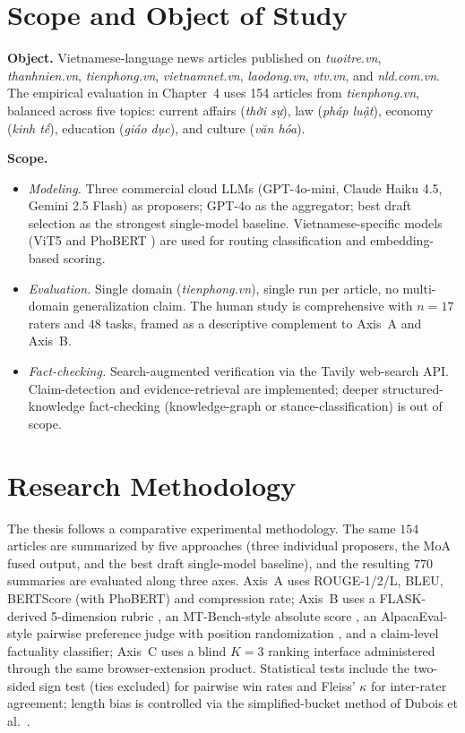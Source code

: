 \section*{Scope and Object of Study}

\textbf{Object.} Vietnamese-language news articles published on
\textit{tuoitre.vn}, \textit{thanhnien.vn}, \textit{tienphong.vn},
\textit{vietnamnet.vn}, \textit{laodong.vn}, \textit{vtv.vn}, and
\textit{nld.com.vn}. The empirical evaluation in Chapter~4 uses 154 articles
from \textit{tienphong.vn}, balanced across five topics: current affairs
(\textit{thời sự}), law (\textit{pháp luật}), economy (\textit{kinh tế}),
education (\textit{giáo dục}), and culture (\textit{văn hóa}).

\textbf{Scope.}
\begin{itemize}
  \item \textit{Modeling.} Three commercial cloud LLMs (GPT-4o-mini, Claude
        Haiku 4.5, Gemini 2.5 Flash) as proposers; GPT-4o as the aggregator;
        best draft selection as the strongest single-model baseline.
        Vietnamese-specific models (ViT5 \cite{Nguyen2022} and
        PhoBERT \cite{Nguyen2020}) are used for
        routing classification and embedding-based scoring.
  \item \textit{Evaluation.} Single domain (\textit{tienphong.vn}), single run
        per article, no multi-domain generalization claim. The human study is
        comprehensive with $n = 17$ raters and $48$ tasks, framed as a descriptive
        complement to Axis~A and Axis~B.
  \item \textit{Fact-checking.} Search-augmented verification via the Tavily
        web-search API. Claim-detection and evidence-retrieval are
        implemented; deeper structured-knowledge fact-checking
        (knowledge-graph or stance-classification) is out of scope.
\end{itemize}

\section*{Research Methodology}

The thesis follows a comparative experimental methodology. The same $154$
articles are summarized by five approaches (three individual proposers, the
MoA fused output, and the best draft single-model baseline), and the resulting
$770$ summaries are evaluated along three axes. Axis~A uses ROUGE-1/2/L,
BLEU, BERTScore (with PhoBERT) and compression rate; Axis~B uses a
FLASK-derived 5-dimension rubric \cite{Ye2023}, an MT-Bench-style absolute
score \cite{Zheng2023}, an AlpacaEval-style pairwise preference judge with
position randomization \cite{Dubois2024}, and a claim-level factuality
classifier; Axis~C uses a blind $K = 3$ ranking interface administered
through the same browser-extension product. Statistical tests include the
two-sided sign test (ties excluded) for pairwise win rates and Fleiss'
$\kappa$ \cite{Landis1977} for inter-rater agreement; length bias is
controlled via the simplified-bucket method of
Dubois et al.\ \cite{Dubois2024}.

